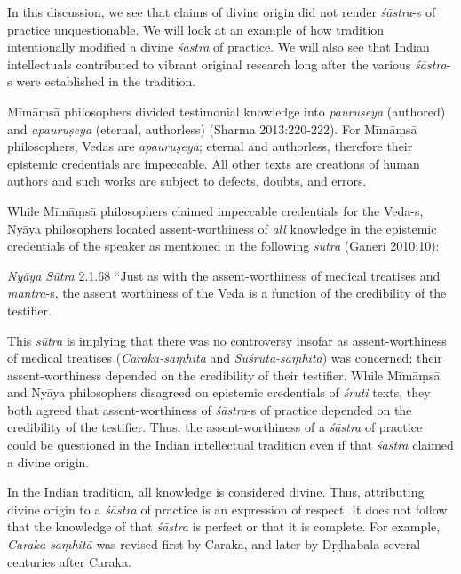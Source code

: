 In this discussion, we see that claims of divine origin did not render {\sl śāstra}-s of practice unquestionable. We will look at an example of how tradition intentionally modified a divine {\sl śāstra} of practice. We will also see that Indian intellectuals contributed to vibrant original research long after the various {\sl śāstra}-s were established in the tradition.

Mīmāṃsā philosophers divided testimonial knowledge into {\sl pauruṣeya} (authored) and {\sl apauruṣeya} (eternal, authorless) (Sharma 2013:220-222). For Mīmāṃsā philosophers, Vedas are {\sl apauruṣeya}; eternal and authorless, therefore their epistemic credentials are impeccable. All other texts are creations of human authors and such works are subject to defects, doubts, and errors.

While Mīmāṃsā philosophers claimed impeccable credentials for the Veda-s, Nyāya philosophers located assent-worthiness of {\sl all} knowledge in the epistemic credentials of the speaker as mentioned in the following {\sl sūtra} (Ganeri 2010:10):
\begin{myquote}
{{\sl Nyāya Sūtra}\relax}  2.1.68 ``Just as with the assent-worthiness of medical treatises and {\sl mantra}-s, the assent worthiness of the Veda is a function of the credibility of the testifier.
\end{myquote}

This {\sl sūtra} is implying that there was no controversy insofar as assent-worthiness of medical treatises ({\sl Caraka-saṃhitā} and {\sl Suśruta-saṃhitā}) was concerned; their assent-worthiness depended on the credibility of their testifier. While Mīmāṃsā and Nyāya philosophers disagreed on epistemic credentials of {\sl śruti} texts, they both agreed that assent-worthiness of {\sl śāstra}-s of practice depended on the credibility of the testifier. Thus, the assent-worthiness of a {\sl śāstra} of practice could be questioned in the Indian intellectual tradition even if that {\sl śāstra} claimed a divine origin.


In the Indian tradition, all knowledge is considered divine.  Thus, attributing divine origin to a {\sl śāstra} of practice is an expression of respect.  It does not follow that the knowledge of that {\sl śāstra} is perfect or that it is complete.  For example, {\sl Caraka-saṃhitā} was revised first by Caraka, and later by Dṛḍhabala several centuries after Caraka.

